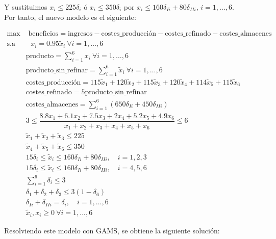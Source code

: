 \documentclass[12pt,a4paper,twoside,openright,titlepage,final]{article}
\begin{document}
Y sustituimos $x_i \leq 225\delta_i$ ó $x_i \leq 350\delta_i$ por $x_i \leq  160\delta_{Ii} + 80\delta_{IIi}$, $i=1,\dots,6$.\\

Por tanto, el nuevo modelo es el siguiente:

\begin{align*}
\max & \text{ beneficios} = \text{ingresos} - \text{costes\_producción} - \text{costes\_refinado} - \text{costes\_almacenes}\\
\text{s.a} & \text{\ } x_i = 0.95\tilde{x}_i \ \forall i = 1, \dots, 6 \\
& \text{producto} = \sum_{i=1}^{6} x_i \ \forall i = 1, \dots, 6 \\
&\text{producto\_sin\_refinar} = \sum_{i=1}^{6} \tilde{x}_i \ \forall i = 1, \dots, 6\\
&\text{costes\_producción} = 115\tilde{x}_1 + 120\tilde{x}_2 + 115\tilde{x}_3 + 120\tilde{x}_4 + 114\tilde{x}_5 + 115\tilde{x}_6 \\
&\text{costes\_refinado} = 5\text{producto\_sin\_refinar} \\
&\text{costes\_almacenes} = \sum_{i=1}^{6} (650\delta_{Ii} + 450\delta_{IIi}) \\
& 3 \leq \dfrac{8.8x_1 + 6.1x_2 + 7.5x_3 + 2x_4 + 5.2x_5 + 4.9x_6}{x_1 + x_2 + x_3 + x_4 + x_5 + x_6} \leq 6\\
&\tilde{x}_1 + \tilde{x}_2 + \tilde{x}_3 \leq 225\\
&\tilde{x}_4 + \tilde{x}_5 + \tilde{x}_6 \leq 350\\
&15\delta_i \leq \tilde{x}_i \leq 160\delta_{Ii} + 80\delta_{IIi}, \quad i =1,2,3\\
&15\delta_i \leq \tilde{x}_i \leq 160\delta_{Ii} + 80\delta_{IIi}, \quad i =4,5,6 \\
&\sum_{i=1}^{6} \delta_i \leq 3\\
&\delta_1 + \delta_2 + \delta_3 \leq 3(1-\delta_6)\\
&\delta_{Ii} + \delta_{IIi} = \delta_i, \quad i = 1,\dots, 6\\
&\tilde{x}_i, x_i \geq 0 \ \forall i=1,...,6
\end{align*}

Resolviendo este modelo con GAMS, se obtiene la siguiente solución:
\end{document}
